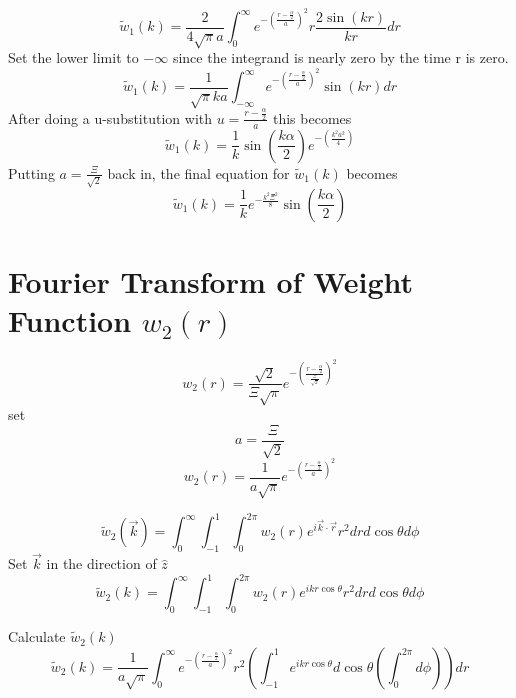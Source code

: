\documentclass[double,12pt]{beavtex}
\begin{document}
\begin{equation}{\widetilde{w}_1(k)=\frac{2}{4\sqrt{\pi}a}\int_{0}^{\infty}e^{-\left(\frac{r-\frac{\alpha}{2}}{a}\right)^2}r\frac{2\sin(kr)}{kr}d{r}}\end{equation}
Set the lower limit to $-\infty$ since the integrand is nearly zero by the time r is zero. 
\begin{equation}{\widetilde{w}_1(k)=\frac{1}{\sqrt{\pi}ka}\int_{-\infty}^{\infty}e^{-\left(\frac{r-\frac{\alpha}{2}}{a}\right)^2}\sin(kr)d{r}}\end{equation}
After doing a u-substitution with $u=\frac{r-\frac{\alpha}{2}}{a}$ this becomes
\begin{equation}{\widetilde{w}_1(k)=\frac{1}{k}\sin\left(\frac{k\alpha}{2}\right)e^{-\left(\frac{k^2a^2}{4}\right)}}\end{equation}
Putting $a=\frac{\Xi}{\sqrt{2}}$ back in, the final equation for $\widetilde{w}_1(k)$ becomes
\begin{equation}
    \widetilde{w}_1(k)=\frac{1}{k}e^{-\frac{k^2\Xi^2}{8}}\sin\left(\frac{k\alpha}{2}\right)
\end{equation}

\section{Fourier Transform of Weight Function $w_{2}(r)$}
\begin{equation}{w_2(r)=\frac{\sqrt{2}}{\Xi\sqrt{\pi}}e^{-\left(\frac{r-\frac{\alpha}{2}}{\frac{\Xi}{\sqrt{2}}}\right)^2}}\end{equation}
set 
\begin{equation}{a=\frac{\Xi}{\sqrt{2}}}\end{equation}
\begin{equation}{w_2(r)=\frac{1}{a\sqrt{\pi}}e^{-\left(\frac{r-\frac{\alpha}{2}}{a}\right)^2}}\end{equation}

\begin{equation}{\widetilde{w}_2(\vec{k})=\int_{0}^{\infty}\int_{-1}^{1}\int_{0}^{2\pi}w_2(r)e^{i\vec{k}\cdot{\vec{r}}}r^2d{r}d{\cos\theta}d{\phi}}\end{equation}
Set $\vec{k}$ in the direction of $\hat{z}$ 
\begin{equation}{\widetilde{w}_2(k)=\int_{0}^{\infty}\int_{-1}^{1}\int_{0}^{2\pi}w_2(r)e^{ikr\cos\theta}r^2d{r}d{\cos\theta}d{\phi}}\end{equation}

\noindent Calculate $\widetilde{w}_2(k)$ 
\begin{equation}{\widetilde{w}_2(k)=\frac{1}{a\sqrt{\pi}}\int_{0}^{\infty}e^{-\left(\frac{r-\frac{\alpha}{2}}{a}\right)^2}r^2\left(\int_{-1}^{1}e^{ikr\cos\theta}d{\cos\theta}\left(\int_{0}^{2\pi}d{\phi}\right)\right)d{r}}\end{equation}
\end{document}
